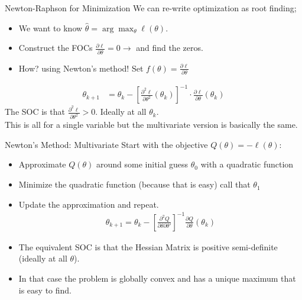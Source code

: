 \documentclass[aspectratio=169,11pt]{beamer}
\begin{document}
\begin{frame}{Newton-Raphson for Minimization}
We can re-write \alert{optimization} as \alert{root finding};
\begin{itemize}
\item We want to know $\hat{\theta} = \arg \max_{\theta} \ell(\theta)$.
\item Construct the FOCs $\frac{\partial \ell}{\partial \theta}=0 \rightarrow$  and find the zeros.
\item How? using Newton's method! Set $f(\theta) = \frac{\partial \ell}{\partial \theta}$
\end{itemize}
\begin{align*}
\theta_{k+1} &= \theta_k -  \left[ \frac{\partial^2 \ell}{\partial \theta^2}(\theta_k) \right]^{-1} \cdot \frac{\partial \ell}{\partial \theta}(\theta_k)
\end{align*}
The SOC is that $ \frac{\partial^2 \ell}{\partial \theta^2} >0$. Ideally at all $\theta_k$.\\
This is all for a \alert{single variable} but the \alert{multivariate} version is basically the same.
\end{frame}


\begin{frame}{Newton's Method: Multivariate}
Start with the objective $Q(\theta) = - \ell(\theta)$:
\begin{itemize}
\item Approximate $Q(\theta)$ around some initial guess $\theta_0$ with a quadratic function
\item Minimize the quadratic function (because that is easy) call that $\theta_1$
\item Update the approximation and repeat.
\begin{align*}
\theta_{k+1} = \theta_k - \left[ \frac{\partial^2 Q}{\partial \theta \partial \theta'} \right]^{-1}\frac{\partial Q}{\partial \theta}(\theta_k)
\end{align*}
\item The equivalent SOC is that the {Hessian Matrix} is \alert{positive semi-definite}  (ideally at all $\theta$).
\item In that case the problem is \alert{globally convex} and has a \alert{unique maximum} that is easy to find.
\end{itemize}
\end{frame}
\end{document}
